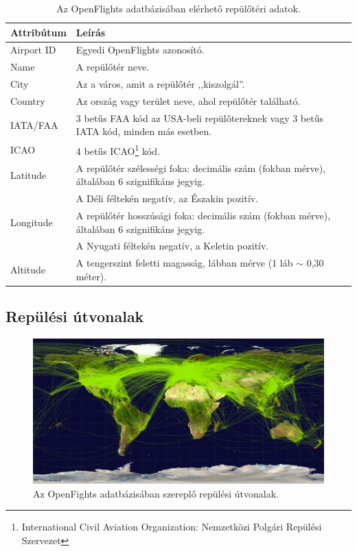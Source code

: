     \begin{table}[ht]
      \footnotesize
      \centering
      \begin{tabular}{ | l | l |}
      \hline
      Attribútum & Leírás \\ \hline
      Airport ID & Egyedi OpenFlights azonosító.\\
      Name & A repülőtér neve.\\
      City & Az a város, amit a repülőtér ,,kiszolgál''.\\
      Country & Az ország vagy terület neve, ahol repülőtér található.\\
      IATA/FAA & 3 betűs FAA kód az USA-beli repülőtereknek vagy 3 betűs IATA kód, minden más esetben.\\
      ICAO & 4 betűs ICAO\footnote{International Civil Aviation Organization: Nemzetközi Polgári Repülési Szervezet} kód.\\
      Latitude & A repülőtér szélességi foka: decimális szám (fokban mérve), általában 6 szignifikáns jegyig.\\
      & A Déli féltekén negatív, az Északin pozitív.\\
      Longitude & A repülőtér hosszúsági foka: decimális szám (fokban mérve), általában 6 szignifikáns jegyig.\\
      & A Nyugati féltekén negatív, a Keletin pozitív.\\
      Altitude & A tengerszint feletti magasság, lábban mérve (1 láb $\sim$ 0,30 méter).\\
      \hline
      \end{tabular}
      \caption{Az OpenFlights adatbázisában elérhető repülőtéri adatok.}
      \label{tab:table_repterek}
    \end{table}

    \subsection{Repülési útvonalak}
    \begin{figure}[!ht]
      \centering
      \includegraphics[width=150mm,keepaspectratio=true]{./figures/routes-2048.png}

      \caption{Az OpenFights adatbázisában szereplő repülési útvonalak.}
      \label{fig:figure_repulesiutvonalak}
    \end{figure}

